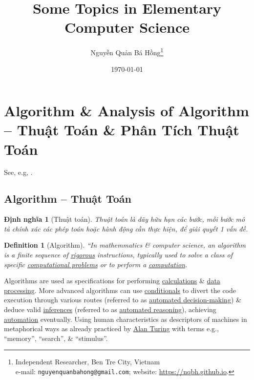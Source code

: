 \documentclass{article}
\title{Some Topics in Elementary Computer Science}
\author{Nguyễn Quản Bá Hồng\footnote{Independent Researcher, Ben Tre City, Vietnam\\e-mail: \texttt{nguyenquanbahong@gmail.com}; website: \url{https://nqbh.github.io}.}}
\date{\today}
\newtheorem{definition}{Definition}
\newtheorem{dinhnghia}{Định nghĩa}
\begin{document}
\maketitle
\begin{abstract}
	
\end{abstract}
\setcounter{secnumdepth}{4}
\setcounter{tocdepth}{3}
\tableofcontents


\section{Algorithm \& Analysis of Algorithm --  Thuật Toán \& Phân Tích Thuật Toán}
See, e.g, \cite[Chuyên đề 1, pp. 5--12]{TLGK_chuyen_Tin_quyen_1}.

\subsection{Algorithm -- Thuật Toán}

\begin{dinhnghia}[Thuật toán]
	\emph{Thuật toán} là dãy hữu hạn các bước, mỗi bước mô tả chính xác các phép toán hoặc hành động cần thực hiện, để giải quyết 1 vấn đề.
\end{dinhnghia}

\begin{definition}[Algorithm]
	``In mathemmatics \& computer science, an \emph{algorithm} is a finite sequence of \href{https://en.wikipedia.org/wiki/Mathematical_proof#Nature_and_purpose}{rigorous} instructions, typically used to solve a class of specific \href{https://en.wikipedia.org/wiki/Computational_problem}{computational problems} or to perform a \href{https://en.wikipedia.org/wiki/Computation}{computation}.
\end{definition}
Algorithms are used as specifications for performing \href{https://en.wikipedia.org/wiki/Calculation}{calculations} \& \href{https://en.wikipedia.org/wiki/Data_processing}{data processing}. More advanced algorithms can use \href{https://en.wikipedia.org/wiki/Conditional_(computer_programming)}{conditionals} to divert the code execution through various routes (referred to as \href{https://en.wikipedia.org/wiki/Automated_decision-making}{automated decision-making}) \& deduce valid \href{https://en.wikipedia.org/wiki/Inference}{inferences} (referred to as \href{https://en.wikipedia.org/wiki/Automated_reasoning}{automated reasoning}), achieving \href{https://en.wikipedia.org/wiki/Automation}{automation} eventually. Using human characteristics as descriptors of machines in metaphorical ways as already practiced by \href{https://en.wikipedia.org/wiki/Alan_Turing}{Alan Turing} with terms e.g., ``memory'', ``search'', \& ``stimulus''.
\end{document}
